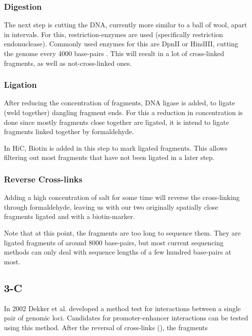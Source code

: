 \subsubsection{Digestion}\label{sec:digestion}

The next step is cutting the DNA, currently more similar to a ball of wool,
apart in intervals. For this, restriction-enzymes are used (specifically
restriction endonuclease). Commonly used enzymes for this are DpnII or HindIII,
cutting the genome every 4000 base-pairs \cite{liebermann2009comprehensive}.
This will result in a lot of cross-linked fragments, as well as
not-cross-linked ones.

\subsubsection{Ligation}\label{sec:ligation}

After reducing the concentration of fragments, DNA ligase is added, to ligate
(weld together) dangling fragment ends. For this a reduction in concentration
is done since mostly fragments close together are ligated, it is intend to
ligate fragments linked together by formaldehyde.

In HiC, Biotin is added in this step to mark ligated fragments. This allows
filtering out most fragments that have not been ligated in a later step.


\subsubsection{Reverse Cross-links}\label{sec:revcrosslink}

Adding a high concentration of salt for some time will reverse the
cross-linking through formaldehyde, leaving us with our two originally
spatially close fragments ligated and with a biotin-marker.


Note that at this point, the fragments are too long to sequence them.
They are ligated fragments of around 8000 base-pairs, but most current
sequencing methods can only deal with sequence lengths of a few hundred
base-pairs at most.




\subsection{3-C}\label{sec:3C} 

In 2002 Dekker et al. \cite{dekker2002capturing} developed a method test for interactions
between a single pair of genomic loci. Candidates for promoter-enhancer
interactions can be tested using this method.
After the reversal of cross-links (), the fragments


